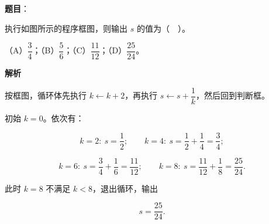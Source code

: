 \begin{answer}

\textbf{题目}：

执行如图所示的程序框图，则输出 $s$ 的值为（　）。
\nopagebreak[4]
\begin{center}\end{center}
\nopagebreak[4]
（A）$\dfrac{3}{4}$；（B）$\dfrac{5}{6}$；（C）$\dfrac{11}{12}$；（D）$\dfrac{25}{24}$。

\textbf{解析}

按框图，循环体先执行 $k\leftarrow k+2$，再执行 $s\leftarrow s+\dfrac{1}{k}$，然后回到判断框。

初始 $k=0$。依次有：

\nopagebreak[4]
\[
k=2:\ s=\frac{1}{2};\qquad
k=4:\ s=\frac{1}{2}+\frac{1}{4}=\frac{3}{4};
\]

\nopagebreak[4]
\[
k=6:\ s=\frac{3}{4}+\frac{1}{6}=\frac{11}{12};\qquad
k=8:\ s=\frac{11}{12}+\frac{1}{8}=\frac{25}{24}.
\]

此时 $k=8$ 不满足 $k<8$，退出循环，输出

\nopagebreak[4]
\[
s=\frac{25}{24}.
\]


\end{answer}
